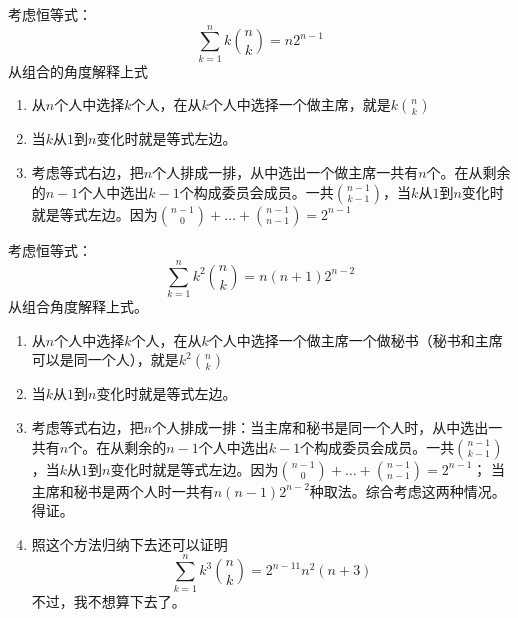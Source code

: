 \documentclass[10pt,a4paper,UTF8]{article}
\begin{document}
\begin{tikzproblem}
考虑恒等式：
\begin{equation}
\label{eq:5}
\sum_{k=1}^{n} k\binom{n}{k} = n 2^{n-1}
\end{equation}
从组合的角度解释上式
\end{tikzproblem}

\begin{tikzanswer}
\begin{enumerate}
\item 从\(n\)个人中选择\(k\)个人，在从\(k\)个人中选择一个做主席，就是\(k\binom{n}{k}\)
\item 当\(k\)从\(1\)到\(n\)变化时就是等式左边。
\item 考虑等式右边，把\(n\)个人排成一排，从中选出一个做主席一共有\(n\)个。在从剩余的\(n-1\)个人中选出\(k-1\)个构成委员会成员。一共\(\binom{n-1}{k-1}\)，当\(k\)从\(1\)到\(n\)变化时就是等式左边。因为\(\binom{n-1}{0} +\ldots +\binom{n-1}{n-1} = 2^{n-1}\)
\end{enumerate}
\end{tikzanswer}

\begin{tikzproblem}
考虑恒等式：
\begin{equation}
\label{eq:6}
\sum_{k=1}^{n} k^{2}\binom{n}{k} = n(n+1) 2^{n-2}
\end{equation}
从组合角度解释上式。
\end{tikzproblem}
\begin{tikzanswer}
\begin{enumerate}
\item 从\(n\)个人中选择\(k\)个人，在从\(k\)个人中选择一个做主席一个做秘书（秘书和主席可以是同一个人），就是\(k^{2}\binom{n}{k}\)
\item 当\(k\)从\(1\)到\(n\)变化时就是等式左边。
\item 考虑等式右边，把\(n\)个人排成一排：当主席和秘书是同一个人时，从中选出一共有\(n\)个。在从剩余的\(n-1\)个人中选出\(k-1\)个构成委员会成员。一共\(\binom{n-1}{k-1}\)，当\(k\)从\(1\)到\(n\)变化时就是等式左边。因为\(\binom{n-1}{0} +\ldots +\binom{n-1}{n-1} = 2^{n-1}\)； 当主席和秘书是两个人时一共有\(n(n-1)2^{n-2}\)种取法。综合考虑这两种情况。得证。
\item 照这个方法归纳下去还可以证明\[ \sum_{k=1}^{n} k^{3}\binom{n}{k} = 2^{n-11}n^{2}(n+3) \]不过，我不想算下去了。
\end{enumerate}
\end{tikzanswer}
\end{document}
